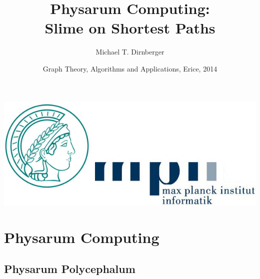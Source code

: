 \documentclass[	hyperref={pdfpagelabels=false}, xcolor=dvipsnames,
		11pt]{beamer}
\title{Physarum Computing:\\ Slime on Shortest Paths}
\author{Michael T. Dirnberger}
\institute{Max Planck Institute for Informatics Saarbr\"ucken}
\date{Graph Theory, Algorithms and Applications, Erice, 2014\\[2em]
% 
}
\begin{document}
\begin{frame}[plain]

\titlepage
\vspace{-1cm}
	    \begin{center}
		\includegraphics[width=0.3\linewidth]{./pics/mpilogo.jpg}
	    \end{center}
\end{frame} 



\section{Physarum Computing} 
\subsection{Physarum Polycephalum}
\end{document}
